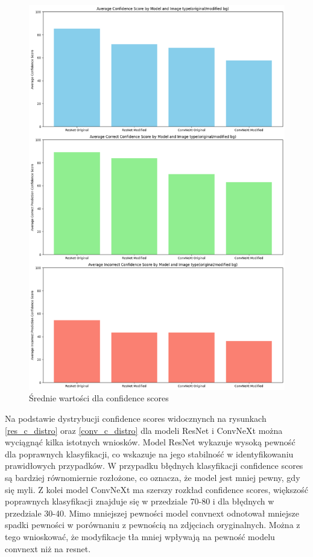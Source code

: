 \begin{figure}
	\centering\includegraphics[width=.9\textwidth]{img/confidence_avg}
	\caption{Średnie wartości dla confidence scores}  
    \label{rys:confidence_avg}
\end{figure}
\newpage
Na podstawie dystrybucji confidence scores widocznynch na rysunkach \ref*{res_c_distro} oraz \ref*{conv_c_distro} dla modeli ResNet i ConvNeXt można wyciągnąć kilka istotnych wniosków. Model ResNet wykazuje wysoką pewność dla poprawnych 
klasyfikacji, co wskazuje na jego stabilność w identyfikowaniu prawidłowych przypadków. W przypadku błędnych klasyfikacji confidence scores są bardziej równomiernie rozłożone, co oznacza, że model jest mniej pewny, gdy się myli. Z kolei 
model ConvNeXt ma szerszy rozkład confidence scores, większość poprawnych klasyfikacji znajduje się w przedziale 70-80 i dla błędnych w przedziale 30-40. Mimo mniejszej pewności model convnext odnotował mniejsze spadki pewności w porównaniu
z pewnością na zdjęciach oryginalnych. Można z tego wnioskować, że modyfikacje tła mniej wpływają na pewność modelu convnext niż na resnet.

